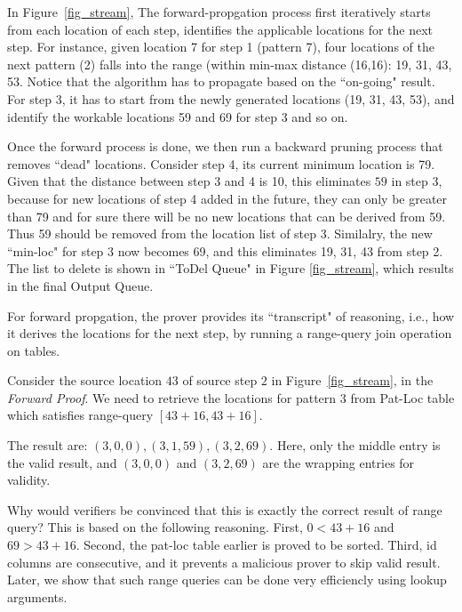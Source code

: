 \begin{example}
	In Figure\ \ref{fig_stream}, The forward-propgation process
first iteratively starts from each location of each step, identifies
the applicable locations for the next step. For instance, given location 7
for step 1 (pattern 7), four locations of the next pattern (2) falls
into the range (within min-max distance (16,16): 19, 31, 43, 53.
Notice that the algorithm has to propagate based on the ``on-going" result.
For step 3, it has to start from the newly generated locations (19, 31, 43, 53),
and identify the workable locations 59 and 69 for step 3 and so on.

   Once the forward process is done, we then run a backward pruning process
that removes ``dead" locations. Consider step 4, its current minimum
location is 79. Given that the distance between step 3 and 4 is 10,
this eliminates $59$ in step 3, because for new locations of step 4
added in the future, they can only be greater than 79 and for sure
there will be no new locations that can be derived from 59. Thus
59 should be removed from the location list of step 3. Similalry,
the new ``min-loc" for step 3 now becomes 69, and this eliminates
19, 31, 43 from step 2. The list to delete is shown in ``ToDel Queue"
in Figure \ref{fig_stream}, which results in the final Output Queue.
\end{example}

For forward propgation, the prover provides its ``transcript" of reasoning,
i.e., how it derives the locations for the next step,
by running a range-query join operation on tables.

\begin{example}
Consider the source location $43$ of source step $2$
in Figure\ \ref{fig_stream}, in the {\em Forward Proof}. 
We need to retrieve the locations for pattern $3$
from Pat-Loc table which satisfies range-query
$[43+16,43+16]$.

The result are:
$(3,0,0), (3,1,59), (3,2,69)$. Here,
only the middle entry is the valid result,
and $(3,0,0)$ and $(3,2,69)$ are the
wrapping entries for validity. 

Why would verifiers be convinced that this is exactly
the correct result of range query? 
This is based on the following reasoning.
First, $0<43+16$ and $69>43+16$.
Second, the pat-loc table earlier is proved to be sorted. 
Third, id columns are consecutive, and it prevents
a malicious prover to skip valid result.
Later, we show that such range queries can be
done very efficiencly using lookup arguments.
\end{example}

